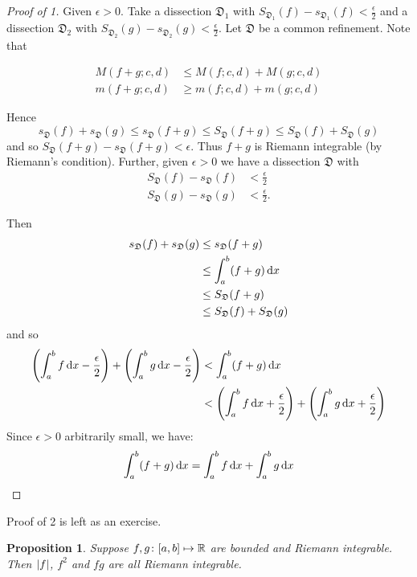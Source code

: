 \documentclass{notes}
\theoremstyle{plain}
\newtheorem{proposition}{Proposition}[chapter]
\newcommand{\dis}{\mathfrak{D}}
\begin{document}
\begin{proof}[Proof of 1]
Given $ \epsilon>0 $.
Take a dissection $ \dis_{1} $ with
$S_{\dis_{1}}(f) - s_{\dis_{1}}(f) < \frac{\epsilon}{2}$
and a dissection $ \dis_{2} $ with
$S_{\dis_{2}}(g) - s_{\dis_{2}}(g) < \frac{\epsilon}{2}$.
Let $ \dis $ be a common refinement.
Note that

\begin{align*}
M(f+g;c,d) & \leq M(f;c,d)+M(g;c,d) \\
m(f+g;c,d) & \geq m(f;c,d)+m(g;c,d)
\end{align*}

Hence
\[ s_{\dis}(f)+s_{\dis}(g) \leq s_{\dis}(f+g) \leq S_{\dis}(f+g) \leq 
S_{\dis}(f)+S_{\dis}(g) \]
and so $S_{\dis}(f+g) - s_{\dis}(f+g) < \epsilon$.  Thus $f+g$ is
Riemann integrable (by Riemann's condition).
Further, given $ \epsilon>0 $ we have a dissection $ \dis $ with
\begin{align*}
S_{\dis}(f)-s_{\dis}(f) & <  \frac{\epsilon}{2} \\
S_{\dis}(g)-s_{\dis}(g) & <  \frac{\epsilon}{2}.
\end{align*}

Then
\begin{align*}
s_{\dis}(f)+s_{\dis}(g) & \leq s_{\dis}(f+g) \\
& \leq \int_{a}^{b}(f+g)\,\ud x \\
& \leq S_{\dis}(f+g) \\
& \leq S_{\dis}(f) + S_{\dis}(g)
\end{align*}
and so
\begin{align*}
\left( \int_{a}^{b}f \,\mathrm{d} x - \frac{\epsilon}{2} \right) + 
\left( \int_{a}^{b}g\,\mathrm{d} x-\frac{\epsilon}{2} \right) & < 
\int_{a}^{b}(f+g)\,\mathrm{d} x \\
& < \left( \int_{a}^{b}f \,\mathrm{d} x + \frac{\epsilon}{2} \right) 
 + \left( \int_{a}^{b}g\,\mathrm{d} x+\frac{\epsilon}{2} \right)
\end{align*}
Since $ \epsilon>0 $ arbitrarily small, we have:
\[ \int_{a}^{b}(f+g)\,\mathrm{d} x = \int_{a}^{b}f\,\mathrm{d} x + \int_{a}^{b}g\,\mathrm{d} x \]
\end{proof}

Proof of 2 is left as an exercise.

\begin{proposition}
  Suppose $ f,g\colon [a,b]\mapsto \mathbb{R} $ are bounded and Riemann
  integrable. Then $ \left|f\right|$, $ f^{2} $ and $ fg $ are all Riemann
  integrable.
\end{proposition}
\end{document}
